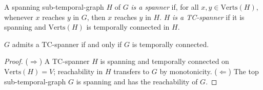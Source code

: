\begin{definition}
  \label{def:spanner}
  \leanok
  A spanning sub-temporal-graph $H$ of $G$ \emph{is a spanner} if, for all
  $x, y \in \mathrm{Verts}(H)$, whenever $x$ reaches $y$ in $G$, then $x$ reaches
  $y$ in $H$. $H$ \emph{is a TC-spanner} if it is spanning and $\mathrm{Verts}(H)$ is
  temporally connected in $H$.
\end{definition}

\begin{lemma}
  \label{lem:tcspanner-iff-tc}
  \leanok
  $G$ admits a TC-spanner if and only if $G$ is temporally connected.
\end{lemma}

\begin{proof}
  \leanok
  ($\Rightarrow$) A TC-spanner $H$ is spanning and temporally connected on $\mathrm{Verts}(H) = V$; reachability in $H$ transfers to $G$ by monotonicity. ($\Leftarrow$) The top sub-temporal-graph $G$ is spanning and has the reachability of $G$.
\end{proof}
